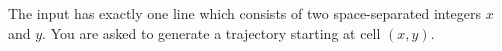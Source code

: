 The input has exactly one line which consists of two space-separated integers 
$x$ and $y$.
You are asked to generate a trajectory starting at
cell $(x,y)$.
